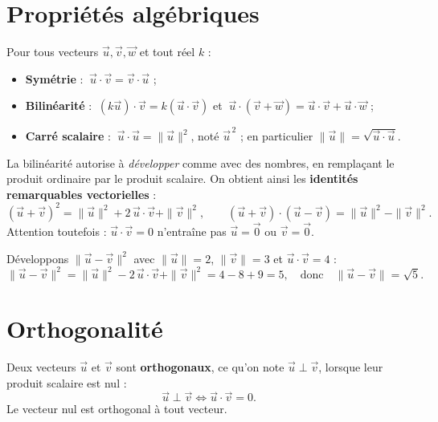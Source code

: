 \section{Propriétés algébriques}

\begin{propriete}
Pour tous vecteurs $\vec{u},\vec{v},\vec{w}$ et tout réel $k$ :
\begin{itemize}
  \item \textbf{Symétrie} : $\ \vec{u}\cdot\vec{v}=\vec{v}\cdot\vec{u}$ ;
  \item \textbf{Bilinéarité} :
        $\ (k\vec{u})\cdot\vec{v}=k(\vec{u}\cdot\vec{v})$ et
        $\ \vec{u}\cdot(\vec{v}+\vec{w})=\vec{u}\cdot\vec{v}+\vec{u}\cdot\vec{w}$ ;
  \item \textbf{Carré scalaire} :
        $\ \vec{u}\cdot\vec{u}=\|\vec{u}\|^2$, noté $\vec{u}^{\,2}$ ; en particulier
        $\|\vec{u}\|=\sqrt{\vec{u}\cdot\vec{u}}$.
\end{itemize}
\end{propriete}

\begin{remarque}
La bilinéarité autorise à \emph{développer} comme avec des nombres, en remplaçant le
produit ordinaire par le produit scalaire. On obtient ainsi les \textbf{identités
remarquables vectorielles} :
\[ (\vec{u}+\vec{v})^2=\|\vec{u}\|^2+2\,\vec{u}\cdot\vec{v}+\|\vec{v}\|^2,\qquad
   (\vec{u}+\vec{v})\cdot(\vec{u}-\vec{v})=\|\vec{u}\|^2-\|\vec{v}\|^2. \]
Attention toutefois : $\vec{u}\cdot\vec{v}=0$ n'entraîne pas $\vec{u}=\vec{0}$ ou
$\vec{v}=\vec{0}$.
\end{remarque}

\begin{exemple}
Développons $\|\vec{u}-\vec{v}\|^2$ avec $\|\vec{u}\|=2$, $\|\vec{v}\|=3$ et
$\vec{u}\cdot\vec{v}=4$ :
\[ \|\vec{u}-\vec{v}\|^2=\|\vec{u}\|^2-2\,\vec{u}\cdot\vec{v}+\|\vec{v}\|^2
   =4-8+9=5,\quad\text{donc}\quad\|\vec{u}-\vec{v}\|=\sqrt{5}. \]
\end{exemple}

\section{Orthogonalité}

\begin{definition}
Deux vecteurs $\vec{u}$ et $\vec{v}$ sont \textbf{orthogonaux}, ce qu'on note
$\vec{u}\perp\vec{v}$, lorsque leur produit scalaire est nul :
\[ \vec{u}\perp\vec{v}\iff \vec{u}\cdot\vec{v}=0. \]
Le vecteur nul est orthogonal à tout vecteur.
\end{definition}

